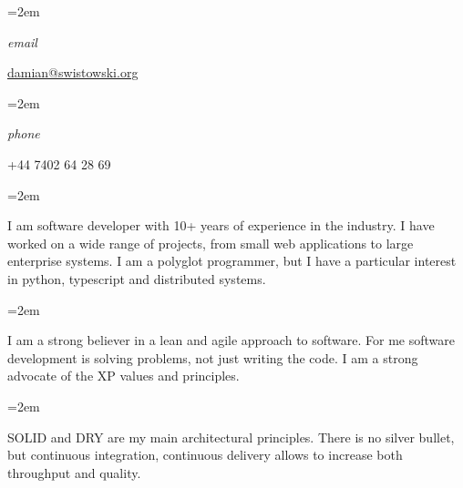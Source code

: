 \documentclass{scrartcl}
\newlength{\datebox}\settowidth{\datebox}{Spring 2011} %
\newcommand{\NewEntry}[3]{\noindent\hangindent=2em\hangafter=0 \parbox{\datebox}{\small \textit{#1}}\hspace{1.5em} #2 #3 %
\vspace{0.5em}} %
\newcommand{\Description}[1]{\hangindent=2em\hangafter=0\noindent\raggedright\footnotesize{#1}\par\normalsize\vspace{1em}} %
\begin{document}
\pagestyle{empty} %


\begin{cv}{}\vspace{1.5em} %

\noindent{}\vspace{0.5em} %


\NewEntry{email}{\href{mailto:damian@swistowski.org}{damian@swistowski.org}} %

\date{}
\NewEntry{phone}{+44 7402 64 28 69} %



\vspace{1em}

\Description{I am software developer with 10+ years of experience in the industry. I have worked on a wide range of projects, from small web applications to large enterprise systems. I am a polyglot programmer, but I have a particular interest in python, typescript and distributed systems.
} %

\Description{I am a strong believer in a lean and agile approach to software. For me software development is  solving problems, not just writing the code. I am a strong advocate of the XP values and principles.
} %

\Description{SOLID and DRY are my main architectural principles. There is no silver bullet, but  continuous integration, continuous delivery allows to increase both throughput and quality.
} %






\end{cv}
\end{document}
